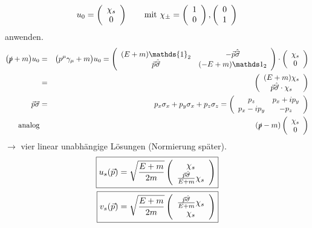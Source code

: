 \begin{eqnarray*} u_0 = \left ( \begin{array}{c} \chi_s\\0\end{array}\right )\qquad
\text{mit }\chi_{\pm} = \left ( \begin{array}{c} 1\\0\end{array} \right ),\left ( \begin{array}{c} 0\\1\end{array} \right )
\end{eqnarray*} anwenden.
\begin{eqnarray*}
\big( \slashed p + m \big ) u_0 \g \big ( p^\mu \gamma_\mu + m \big ) u_0 = \left (\begin{array}{cc} (E+m){\mathds {1}}_2 & -\vec p\hat{\vec \sigma} \\ \vec p \hat{\vec \sigma}& (-E+m){\mathds 1}_2 \end{array}\ri) \cdot\left ( \begin{array}{c} \chi_s\\0\end{array}\ri) \\ \g \left( \begin{array}{c} (E+m)\chi_s \\\vec p\hat{\vec \sigma} \cdot \chi_s\end{array}\ri)\\
\vec p \vec \sigma \g p_x\sigma_x + p_y\sigma_x + p_z \sigma_z = \left ( \begin{array}{cc} p_z & p_x+ip_y\\p_x-ip_y&-p_z\end{array}\ri)\\
\text{analog}&{}& (\slashed p - m) \left( \begin{array}{c} \chi_s\\0 \end{array}\ri )
\end{eqnarray*}
$\longrightarrow$ vier linear unabhängige Lösungen (Normierung später).
\begin{eqnarray*}
\boxed{ u_s (\vec p) = \sqrt{\frac{E+m}{2m}} \left(\begin{array}{c} \chi_s\\ \frac{\vec p \hat{\vec \sigma}}{E+m} \chi_s\end{array}\right )}\\
 \boxed{v_s (\vec p) = \sqrt{\frac{E+m}{2m}} \left(\begin{array}{c} \frac{\vec p \hat{\vec \sigma}}{E+m} \chi_s\\ \chi_s\end{array}\right )}
\end{eqnarray*}
